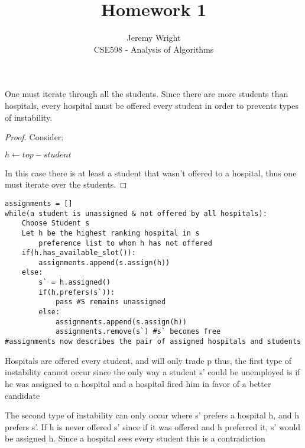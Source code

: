 \documentclass[12pt]{article}
\newenvironment{problem}[2][Problem]{\begin{trivlist}
\item[\hskip \labelsep {\bfseries #1}\hskip \labelsep {\bfseries #2.}]}{\end{trivlist}}
\begin{document}
 
 
\title{Homework 1}%
\author{Jeremy Wright\\ %
CSE598 - Analysis of Algorithms} %
 
\maketitle
\begin{problem}{1.4}
    One must iterate through all the students. Since there are more students
    than hospitals, every hospital must be offered every student in order to
    prevents types of instability.

    \begin{proof}
        Consider:\\
        \begin{algorithmic}
            \State $h \gets top-student$
            \EndFor
        \end{algorithmic}
        In this case there is at least a student that wasn't offered to
        a hospital, thus one must iterate over the students.
    \end{proof}
    \lstset{language=Python}
    \begin{lstlisting}
assignments = []
while(a student is unassigned & not offered by all hospitals):
    Choose Student s
    Let h be the highest ranking hospital in s 
        preference list to whom h has not offered
    if(h.has_available_slot()):
        assignments.append(s.assign(h))
    else:
        s` = h.assigned()
        if(h.prefers(s`)):
            pass #S remains unassigned
        else:
            assignments.append(s.assign(h))
            assignments.remove(s`) #s` becomes free
#assignments now describes the pair of assigned hospitals and students
    \end{lstlisting}

    Hospitals are offered every student, and will only trade p thus, the first
    type of instability cannot occur since the only way a student s' could be
    unemployed is if he was assigned to a hospital and a hospital fired him in
    favor of a better candidate

    The second type of instability can only occur where s' prefers a hospital h,
    and h prefers s'. If h is never offered s'  since if it was offered and
    h preferred it, s' would be assigned h. Since a hospital sees every student this is a contradiction
\end{problem}
\end{document}
